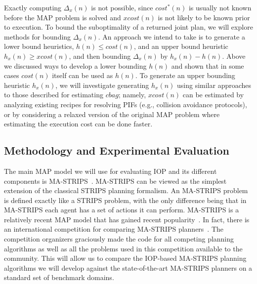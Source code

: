 \documentclass[11pt]{article}
\begin{document}


Exactly computing $\Delta_x(n)$ is not possible, since $cost^*(n)$ is usually not known before the MAP problem is solved and $xcost(n)$ is not likely to be known prior to execution. To bound the suboptimality of a returned joint plan, we will explore methods for bounding $\Delta_x(n)$. 
An approach we intend to take is to generate a lower bound heuristics, $h(n)\leq cost(n)$, and an upper bound heuristic $h_x(n)\geq xcost(n)$, and then bounding $\Delta_x(n)$ by $h_x(n)-h(n)$. 
Above we discussed ways to develop a lower bounding $h(n)$ and shown that in some cases $cost(n)$ itself can be used as $h(n)$. To generate an upper bounding heuristic $h_x(n)$, we will investigate generating $h_x(n)$ using similar approaches to those described for estimating $cbag$; namely, $xcost(n)$ can be estimated by analyzing existing recipes for resolving PIFs (e.g., collision avoidance protocols), or by considering a relaxed version of the original MAP problem where estimating the execution cost can be done faster. 



\subsection{Methodology and Experimental Evaluation}
\label{sec:methodology}
The main MAP model we will use for evaluating IOP and its different components is MA-STRIPS~\cite{brafman2013complexity}. MA-STRIPS can be viewed as the simplest extension of the classical STRIPS planning formalism. An MA-STRIPS problem is defined exactly like a STRIPS problem, with the only difference being that in MA-STRIPS each agent has a set of actions it can perform. MA-STRIPS is a relatively recent MAP model that has gained recent popularity~\cite{nissim2014distributed,vstolba2014relaxation,brafman2013complexity,zhang2014formal,komenda2013domain,torreno2014fmap,maliah2014privacyPreserving,maliah2015privacy,torreno2015global,jakubuv2015multiagent}.  In fact, there is an international competition for comparing MA-STRIPS planners~\cite{vstolba2015competition}. 
The competition organizers graciously made the code for all competing planning algorithms as well as all the problems used in this competition available to the community. This will allow us to compare the IOP-based MA-STRIPS planning algorithms we will develop against the state-of-the-art MA-STRIPS planners on a standard set of benchmark domains. 
\end{document}
